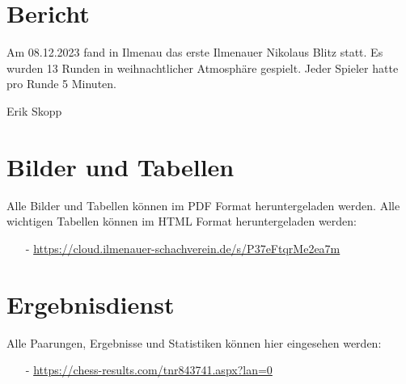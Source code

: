 \documentclass[a4paper,ngerman]{tui-algo-seminar}
\title{\inhalt}
\author{Erik Skopp}
\newcommand{\inhalt}{1. Ilmenauer Nikolaus Blitz 2023}
\begin{document}
\maketitle
\thispagestyle{plain}
\begin{abstract}
    Bericht: \inhalt.\\
    Das erste Nikolaus Blitzturnier des Ilmenauer Schachvereins fand am 08.12.2023 statt. Es wurden 13 Runden mit einer Bedenkzeit von 5 Minuten gespielt. Platz 1 erreichte Andreas Neubauer von BW Stadtilm. Platz 2 ging an Pascal Eichenauer. Platz 3 ging an Ainur Ziganshin.
\end{abstract}

\section{Bericht}
Am 08.12.2023 fand in Ilmenau das erste Ilmenauer Nikolaus Blitz statt. Es wurden 13 Runden in weihnachtlicher Atmosphäre gespielt. Jeder Spieler hatte pro Runde 5 Minuten.

Erik Skopp

\section{Bilder und Tabellen}
Alle Bilder und Tabellen können im PDF Format heruntergeladen werden. Alle wichtigen Tabellen können im HTML Format heruntergeladen werden: \\
\begin{itemize}
    \item[-] \url{https://cloud.ilmenauer-schachverein.de/s/P37eFtqrMe2ea7m}
\end{itemize}

\section{Ergebnisdienst}
Alle Paarungen, Ergebnisse und Statistiken können hier eingesehen werden: 
\begin{itemize}
    \item[-] \url{https://chess-results.com/tnr843741.aspx?lan=0}
\end{itemize}

\clearpage
\end{document}
